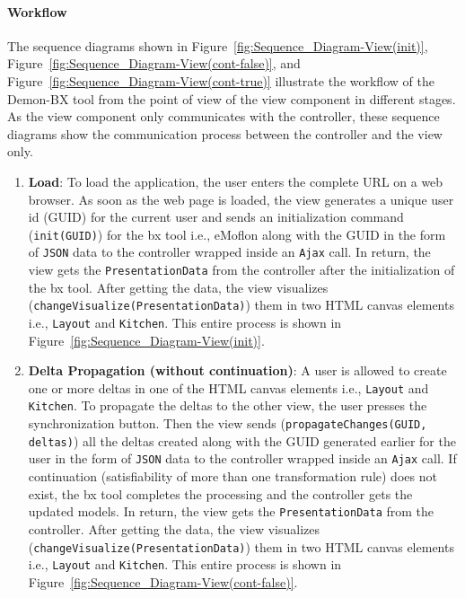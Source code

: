 \paragraph{Workflow}
The sequence diagrams shown in Figure~\ref{fig:Sequence_Diagram-View(init)}, Figure~\ref{fig:Sequence_Diagram-View(cont-false)}, and Figure~\ref{fig:Sequence_Diagram-View(cont-true)} illustrate the workflow of the Demon-BX tool from the point of view of the view component in different stages. As the view component only communicates with the controller, these sequence diagrams show the communication process between the controller and the view only.

\begin{enumerate}
	\item {\textbf{Load}: To load the application, the user enters the complete URL on a web browser. As soon as the web page is loaded, the view generates a unique user id (GUID) for the current user and sends an initialization command (\texttt{init(GUID)}) for the bx tool i.e., eMoflon along with the GUID in the form of \texttt{JSON} data to the controller wrapped inside an \texttt{Ajax} call. In return, the view gets the \texttt{PresentationData} from the controller after the initialization of the bx tool. After getting the data, the view visualizes (\texttt{changeVisualize(PresentationData)}) them in two HTML canvas elements i.e., \texttt{Layout} and \texttt{Kitchen}. This entire process is shown in Figure~\ref{fig:Sequence_Diagram-View(init)}.}
	
	\item {\textbf{Delta Propagation (without continuation)}: A user is allowed to create one or more deltas in one of the HTML canvas elements i.e., \texttt{Layout} and \texttt{Kitchen}. To propagate the deltas to the other view, the user presses the synchronization button. Then the view sends (\texttt{propagateChanges(GUID, deltas)}) all the deltas created along with the GUID generated earlier for the user in the form of \texttt{JSON} data to the controller wrapped inside an \texttt{Ajax} call. If continuation (satisfiability of more than one transformation rule) does not exist, the bx tool completes the processing and the controller gets the updated models. In return, the view gets the \texttt{PresentationData} from the controller. After getting the data, the view visualizes (\texttt{changeVisualize(PresentationData)}) them in two HTML canvas elements i.e., \texttt{Layout} and \texttt{Kitchen}. This entire process is shown in Figure~\ref{fig:Sequence_Diagram-View(cont-false)}.}
	

\end{enumerate}
